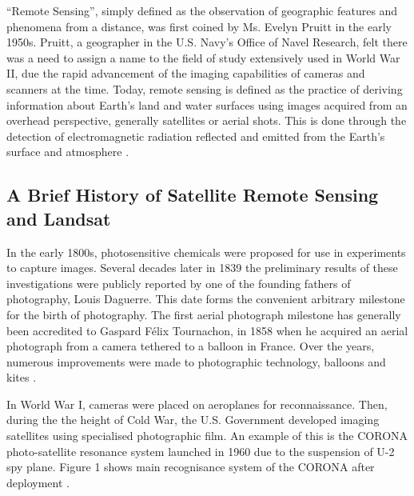 
``Remote Sensing'', simply defined as the observation of geographic features and phenomena from a distance, was first coined by Ms. Evelyn Pruitt in the early 1950s. Pruitt, a geographer in the U.S. Navy's Office of Navel Research, felt there was a need to assign a name to the field of study extensively used in World War II, due the rapid advancement of the imaging capabilities of cameras and scanners at the time. Today, remote sensing is defined as the practice of deriving information about Earth's land and water surfaces using images acquired from an overhead perspective, generally satellites or aerial shots. This is done through the detection of electromagnetic radiation reflected and emitted from the Earth's surface and atmosphere \cite{campbell2011introduction}. 


\subsection{A Brief History of Satellite Remote Sensing and Landsat}
In the early 1800s, photosensitive chemicals were proposed for use in experiments to capture images. Several decades later in 1839 the preliminary results of these investigations were publicly reported by one of the founding fathers of photography, Louis Daguerre. This date forms the convenient arbitrary milestone for the birth of photography. The first aerial photograph milestone has generally been accredited to Gaspard F\'elix Tournachon, in 1858 when he acquired an aerial photograph from a camera tethered to a balloon in France. Over the years, numerous improvements were made to photographic technology, balloons and kites \cite{campbell2011introduction}. 
\par
In World War I, cameras were placed on aeroplanes for reconnaissance. Then, during the the height of Cold War, the U.S. Government developed imaging satellites using specialised photographic film. An example of this is the CORONA photo-satellite resonance system launched in 1960 due to the suspension of U-2 spy plane. Figure 1 shows main recognisance system of the CORONA after deployment \cite{CORONA}. 
\par





